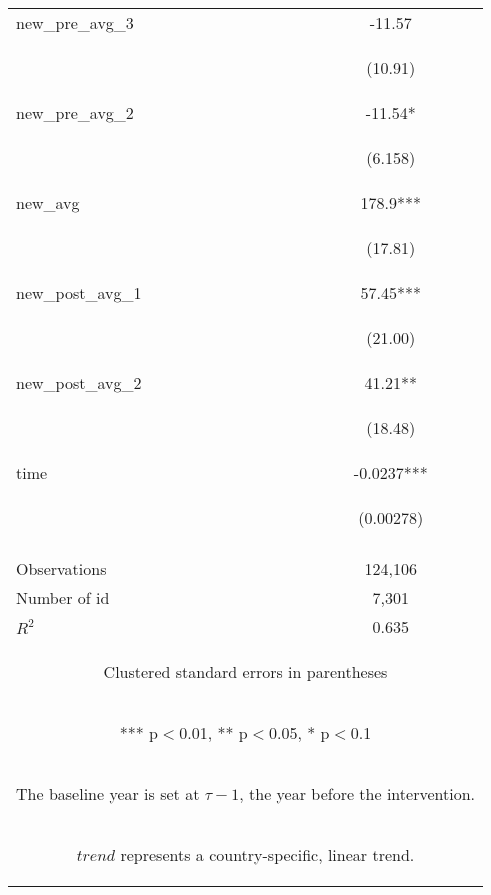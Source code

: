 \documentclass{article}
\begin{document}
\begin{table}[htbp]
{\begin{tabular}{lc}
new\_pre\_avg\_3 & -11.57 \\
\vspace{4pt} & \begin{footnotesize}(10.91)\end{footnotesize} \\
new\_pre\_avg\_2 & -11.54* \\
\vspace{4pt} & \begin{footnotesize}(6.158)\end{footnotesize} \\
new\_avg & 178.9*** \\
\vspace{4pt} & \begin{footnotesize}(17.81)\end{footnotesize} \\
new\_post\_avg\_1 & 57.45*** \\
\vspace{4pt} & \begin{footnotesize}(21.00)\end{footnotesize} \\
new\_post\_avg\_2 & 41.21** \\
\vspace{4pt} & \begin{footnotesize}(18.48)\end{footnotesize} \\
time & -0.0237*** \\
 & \begin{footnotesize}(0.00278)\end{footnotesize} \\
\vspace{4pt} & \begin{footnotesize}\end{footnotesize} \\
Observations & 124,106 \\
Number of id & 7,301 \\
 $R^2$ & 0.635 \\ \hline
\multicolumn{2}{c}{\begin{footnotesize} Clustered standard errors in parentheses\end{footnotesize}} \\
\multicolumn{2}{c}{\begin{footnotesize} *** p$<$0.01, ** p$<$0.05, * p$<$0.1\end{footnotesize}} \\
\multicolumn{2}{c}{\begin{footnotesize} The baseline year is set at $\tau - 1$, the year before the intervention. \end{footnotesize}} \\ 
\multicolumn{2}{c}{\begin{footnotesize} $trend$ represents a country-specific, linear trend.  \end{footnotesize}} \\
\end{tabular}
}
\end{table}
\end{document}
